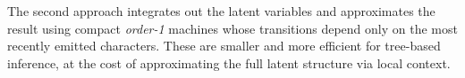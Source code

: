 The second approach integrates out the latent variables and approximates the result
using compact \emph{order-1} machines whose transitions depend only on the most recently
emitted characters.
These are smaller and more efficient for tree-based inference,
at the cost of approximating the full latent structure via local context.

